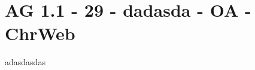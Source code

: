 \section{AG 1.1 - 29 - dadasda - OA - ChrWeb}

\begin{beispiel}[AG 1.1]{1}
adasdasdas
\end{beispiel}
